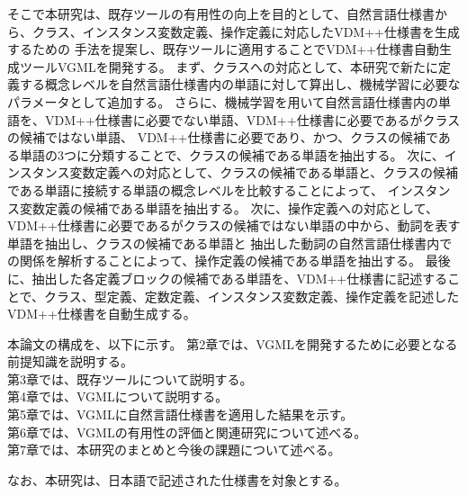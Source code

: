そこで本研究は、既存ツールの有用性の向上を目的として、自然言語仕様書から、クラス、インスタンス変数定義、操作定義に対応したVDM++仕様書を生成するための
手法を提案し、既存ツールに適用することでVDM++仕様書自動生成ツールVGMLを開発する\cite{vgml1,vgml2,vgml3,vgml4}。
まず、クラスへの対応として、本研究で新たに定義する概念レベルを自然言語仕様書内の単語に対して算出し、機械学習に必要なパラメータとして追加する。
さらに、機械学習を用いて自然言語仕様書内の単語を、VDM++仕様書に必要でない単語、VDM++仕様書に必要であるがクラスの候補ではない単語、
VDM++仕様書に必要であり、かつ、クラスの候補である単語の3つに分類することで、クラスの候補である単語を抽出する。
次に、インスタンス変数定義への対応として、クラスの候補である単語と、クラスの候補である単語に接続する単語の概念レベルを比較することによって、
インスタンス変数定義の候補である単語を抽出する。
次に、操作定義への対応として、VDM++仕様書に必要であるがクラスの候補ではない単語の中から、動詞を表す単語を抽出し、クラスの候補である単語と
抽出した動詞の自然言語仕様書内での関係を解析することによって、操作定義の候補である単語を抽出する。
最後に、抽出した各定義ブロックの候補である単語を、VDM++仕様書に記述することで、クラス、型定義、定数定義、インスタンス変数定義、操作定義を記述した
VDM++仕様書を自動生成する。

本論文の構成を、以下に示す。
第2章では、VGMLを開発するために必要となる前提知識を説明する。\\
第3章では、既存ツールについて説明する。\\
第4章では、VGMLについて説明する。\\
第5章では、VGMLに自然言語仕様書を適用した結果を示す。\\
第6章では、VGMLの有用性の評価と関連研究について述べる。\\
第7章では、本研究のまとめと今後の課題について述べる。

なお、本研究は、日本語で記述された仕様書を対象とする。
